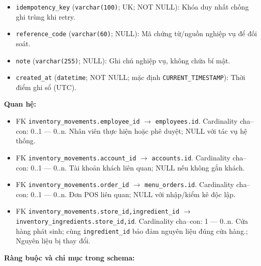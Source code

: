 \begin{itemize}
\item \texttt{idempotency\_key} (\texttt{varchar(100)}; UK; NOT NULL): Khóa duy nhất chống ghi trùng khi retry.

\item \texttt{reference\_code} (\texttt{varchar(60)}; NULL): Mã chứng từ/nguồn nghiệp vụ để đối soát.

\item \texttt{note} (\texttt{varchar(255)}; NULL): Ghi chú nghiệp vụ, không chứa bí mật.

\item \texttt{created\_at} (\texttt{datetime}; NOT NULL; mặc định \texttt{CURRENT\_TIMESTAMP}): Thời điểm ghi sổ (UTC).

\end{itemize}

\textbf{Quan hệ:}

\begin{itemize}

\item FK \texttt{inventory\_movements.employee\_id} $\rightarrow$ \texttt{employees.id}. Cardinality cha--con: 0..1 — 0..n. Nhân viên thực hiện hoặc phê duyệt; NULL với tác vụ hệ thống.

\item FK \texttt{inventory\_movements.account\_id} $\rightarrow$ \texttt{accounts.id}. Cardinality cha--con: 0..1 — 0..n. Tài khoản khách liên quan; NULL nếu không gắn khách.

\item FK \texttt{inventory\_movements.order\_id} $\rightarrow$ \texttt{menu\_orders.id}. Cardinality cha--con: 0..1 — 0..n. Đơn POS liên quan; NULL với nhập/kiểm kê độc lập.

\item FK \texttt{inventory\_movements.store\_id,ingredient\_id} $\rightarrow$ \texttt{inventory\_ingredients.store\_id,id}. Cardinality cha--con: 1 — 0..n. Cửa hàng phát sinh; cùng \texttt{ingredient\_id} bảo đảm nguyên liệu đúng cửa hàng.; Nguyên liệu bị thay đổi.

\end{itemize}

\textbf{Ràng buộc và chỉ mục trong schema:}

